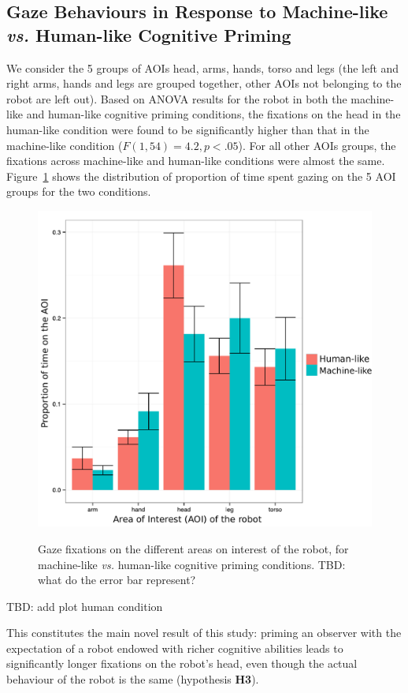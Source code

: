 \documentclass[lettersize, noapacite, twoside, HRI]{apa_HRI}
\newcommand{\vs}{\textit{vs.}\xspace}
\newcommand{\h}[1]{\textbf{H#1}\xspace}
\begin{document}
\subsection{Gaze Behaviours in Response to Machine-like \vs Human-like Cognitive Priming}

We consider the 5 groups of AOIs {\sf head}, {\sf arms}, {\sf hands}, {\sf
torso} and {\sf legs} (the left and right arms, hands and legs are grouped
together, other AOIs not belonging to the robot are left out). Based on ANOVA results for the robot in both the machine-like and human-like
cognitive priming conditions, the fixations on the head in the human-like condition
were found to be significantly higher than that in the machine-like condition
($F(1,54) = 4.2, p < .05$). For all other AOIs groups, the fixations across
machine-like and human-like conditions were almost the same. Figure~\ref{h3} shows the
distribution of proportion of time spent gazing on the 5 AOI groups for the two
conditions.

\begin{figure}[ht!]
    \centering
    \includegraphics[width=0.6\columnwidth]{GazeHighLow}\label{GazeHighLow}
    \caption{Gaze fixations on the different areas on interest of the robot, for machine-like \vs
    human-like cognitive priming conditions. TBD: what do the error bar represent?}
    \label{h3}
\end{figure}

TBD: add plot human condition

This constitutes the main novel result of this study: priming an observer with
the expectation of a robot endowed with richer cognitive abilities leads to significantly longer
fixations on the robot's head, even though the actual behaviour of the robot is
the same (hypothesis \h{3}).
\end{document}
